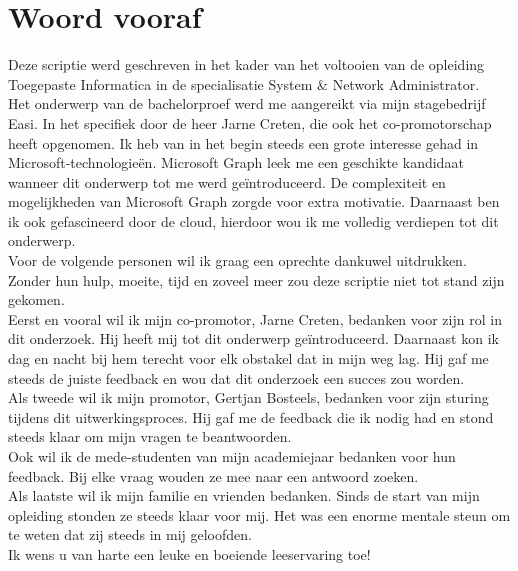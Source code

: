
\chapter*{Woord vooraf}%
\label{ch:voorwoord}


Deze scriptie werd geschreven in het kader van het voltooien van de opleiding Toegepaste Informatica in de specialisatie System \& Network Administrator. \\

Het onderwerp van de bachelorproef werd me aangereikt via mijn stagebedrijf Easi. In het specifiek door de heer Jarne Creten, die ook het co-promotorschap heeft opgenomen. Ik heb van in het begin steeds een grote interesse gehad in Microsoft-technologieën. Microsoft Graph leek me een geschikte kandidaat wanneer dit onderwerp tot me werd geïntroduceerd. De complexiteit en mogelijkheden van Microsoft Graph zorgde voor extra motivatie. Daarnaast ben ik ook gefascineerd door de cloud, hierdoor wou ik me volledig verdiepen tot dit onderwerp. \\

Voor de volgende personen wil ik graag een oprechte dankuwel uitdrukken. Zonder hun hulp, moeite, tijd en zoveel meer zou deze scriptie niet tot stand zijn gekomen. \\

Eerst en vooral wil ik mijn co-promotor, Jarne Creten, bedanken voor zijn rol in dit onderzoek. Hij heeft mij tot dit onderwerp geïntroduceerd. Daarnaast kon ik dag en nacht bij hem terecht voor elk obstakel dat in mijn weg lag. Hij gaf me steeds de juiste feedback en wou dat dit onderzoek een succes zou worden. \\

Als tweede wil ik mijn promotor, Gertjan Bosteels, bedanken voor zijn sturing tijdens dit uitwerkingsproces. Hij gaf me de feedback die ik nodig had en stond steeds klaar om mijn vragen te beantwoorden. \\

Ook wil ik de mede-studenten van mijn academiejaar bedanken voor hun feedback. Bij elke vraag wouden ze mee naar een antwoord zoeken. \\

Als laatste wil ik mijn familie en vrienden bedanken. Sinds de start van mijn opleiding stonden ze steeds klaar voor mij. Het was een enorme mentale steun om te weten dat zij steeds in mij geloofden. \\

Ik wens u van harte een leuke en boeiende leeservaring toe!

